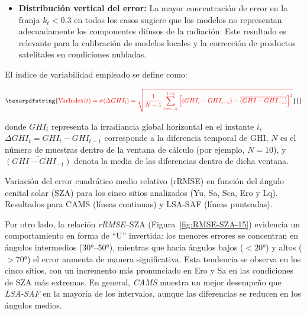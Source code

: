 \documentclass[letterpaper,12pt, twoside]{report}
\providecommand{\DIFdeltex}[1]{{\protect\color{red} \scriptsize #1}} %
\providecommand{\DIFdelFL}[1]{\DIFdel{#1}} %
\providecommand{\DIFdel}[1]{\texorpdfstring{\DIFdeltex{#1}}{}} %
\begin{document}
\begin{itemize}
\item%
\DIFdel{\textbf{Distribución vertical del error:} La mayor concentración de error en la franja $k_t < 0.3$ en todos los casos sugiere que los modelos no representan adecuadamente los componentes difusos de la radiación. Este resultado es relevante para la calibración de modelos locales y la corrección de productos satelitales en condiciones nubladas.
}
\end{itemize}%

\DIFdel{El índice de variabilidad empleado se define como:
}%

\begin{displaymath}
\DIFdel{\mathrm{VarIndex}(t) = 
\sigma(\Delta GHI_t) = 
\sqrt{\frac{1}{N - 1} 
\sum_{i = t - k}^{t + k} 
\left[ (GHI_i - GHI_{i-1}) - 
\overline{(GHI - GHI_{-1})} \right]^2}
}\end{displaymath}%

\DIFdel{donde $GHI_i$ representa la irradiancia global horizontal en el instante $i$, 
$\Delta GHI_t = GHI_t - GHI_{t-1}$ corresponde a la diferencia temporal de GHI, 
$N$ es el número de muestras dentro de la ventana de cálculo (por ejemplo, $N = 10$), 
y $\overline{(GHI - GHI_{-1})}$ denota la media de las diferencias dentro de dicha ventana.
}%

{%
\DIFdelFL{Variación del error cuadrático medio relativo (rRMSE) en función del ángulo cenital solar (SZA) para los cinco sitios analizados (Yu, Sa, Sca, Ero y Lq). Resultados para CAMS (líneas continuas) y LSA-SAF (líneas punteadas).}}

\DIFdel{Por otro lado, la relación \textit{rRMSE}–SZA (Figura~\ref{fig:RMSE-SZA-15}) evidencia un comportamiento en forma de “U” invertida: los menores errores se concentran en ángulos intermedios (30°–50°), mientras que hacia ángulos bajos ($<20°$) y altos ($>70°$) el error aumenta de manera significativa. Esta tendencia se observa en los cinco sitios, con un incremento más pronunciado en Ero y Sa en las condiciones de SZA más extremas. En general, \textit{CAMS} muestra un mejor desempeño que \textit{LSA-SAF} en la mayoría de los intervalos, aunque las diferencias se reducen en los ángulos medios.
}%
\end{document}
